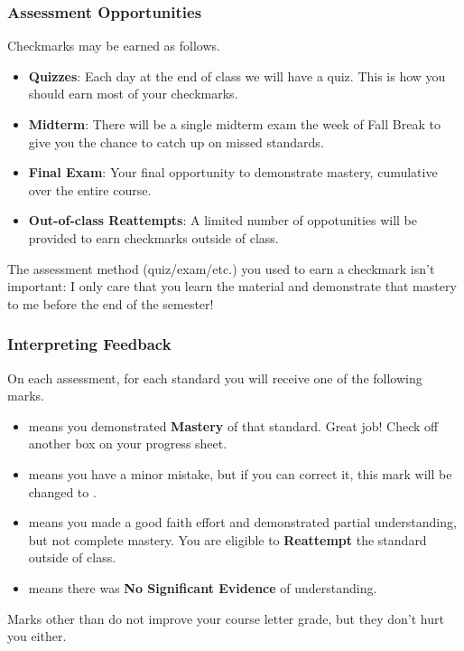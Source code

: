 \begin{frame}\frametitle{Assessment Opportunities}
Checkmarks may be earned as follows.
\begin{itemize}
\item {\bf Quizzes}: Each day at the end of class we will have a quiz. This
      is how you should earn most of your checkmarks.
\item {\bf Midterm}: There will be a single midterm exam the week of Fall Break
      to give you the chance to catch up on missed standards.
\item {\bf Final Exam}: Your final opportunity to demonstrate mastery,
      cumulative over the entire course.
\item {\bf Out-of-class Reattempts}: A limited number of oppotunities
      will be provided to earn checkmarks outside of class.
\end{itemize}

\pause

\vspace{0.2in}

The assessment method (quiz/exam/etc.) you used to earn a checkmark
isn't important: I only care that you
learn the material and demonstrate that mastery to me before the end of the
semester!
\end{frame}

\begin{frame}\frametitle{Interpreting Feedback}
On each assessment, for each standard you will receive one of the following marks.
\begin{itemize}
\item \masteryMark{} means you demonstrated \textbf{Mastery} of that standard.
      Great job!  Check off another box on your progress sheet.
\item \minorMark{} means you have a minor mistake, but if you can correct it,
      this mark will be changed to \masteryMark{}.
\item \reattemptMark{} means you made a good faith effort and demonstrated
      partial understanding, but not complete mastery. You are eligible to
      \textbf{Reattempt} the standard outside of class.
\item \noMark{} means there was \textbf{No Significant Evidence} of understanding.
\end{itemize}

\pause

\vspace{0.2in}

Marks other than \masteryMark{} do not improve your course letter grade, but
they don't hurt you either.
\end{frame}

